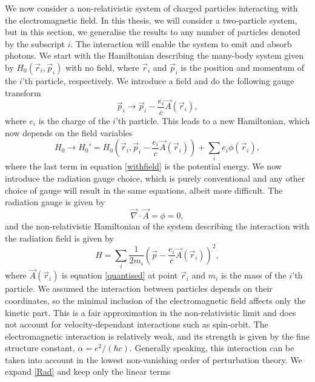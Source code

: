We now consider a non-relativistic system of charged particles interacting with the electromagnetic field. In this thesis, we will consider a two-particle system, but in this section, we generalise the results to any number of particles denoted by the subscript $i$. The interaction will enable the system to emit and absorb photons. We start with the Hamiltonian describing the many-body system given by $H_0(\vec{r}_i,\vec{p}_i)$ with no field, where $\vec{r}_i$ and $\vec{p}_i$ is the position and momentum of the $i$'th particle, respectively. We introduce a field and do the following gauge transform 
\begin{equation} \label{substi}
	\vec{p}_i \rightarrow \vec{p}_i - \frac{e_i}{c}\vec{A}(\vec{r}_i),
\end{equation}
where $e_i$ is the charge of the $i$'th particle. This leads to a new Hamiltonian, which now depends on the field variables
\begin{equation} \label{withfield}
	H_0 \rightarrow H_0' = H_0 \left( \vec{r}_i,\vec{p}_i-\frac{e_i}{c}\vec{A}(\vec{r}_i)\right) + \sum_i e_i \phi(\vec{r}_i),
\end{equation}
where the last term in equation \eqref{withfield} is the potential energy. We now introduce the radiation gauge choice, which is purely conventional and any other choice of gauge will result in the same equations, albeit more difficult. The radiation gauge \cite{Jackson} is given by 
\begin{equation} \label{RadiationGauge}
	\vec{\nabla}\cdot \vec{A} = \phi = 0,
\end{equation}
and the non-relativistic Hamiltonian of the system describing the interaction with the radiation field is given by
\begin{equation} \label{Rad}
	H = \sum_i \frac{1}{2m_i}\left( \vec{p}-\frac{e_i}{c}\vec{A}(\vec{r}_i)\right)^2,
\end{equation}
where $\vec{A}(\vec{r}_i)$ is equation \eqref{quantised} at point $\vec{r}_i$ and $m_i$ is the mass of the $i$'th particle. We assumed the interaction between particles depends on their coordinates, so the minimal inclusion of the electromagnetic field affects only the kinetic part. This is a fair approximation in the non-relativistic limit and does not account for velocity-dependant interactions such as spin-orbit.
The electromagnetic interaction is relatively weak, and its strength is given by the fine structure constant, $\alpha = e^2/(\hbar c)$. Generally speaking, this interaction can be taken into account in the lowest non-vanishing order of perturbation theory. We expand \eqref{Rad} and keep only the linear terms
